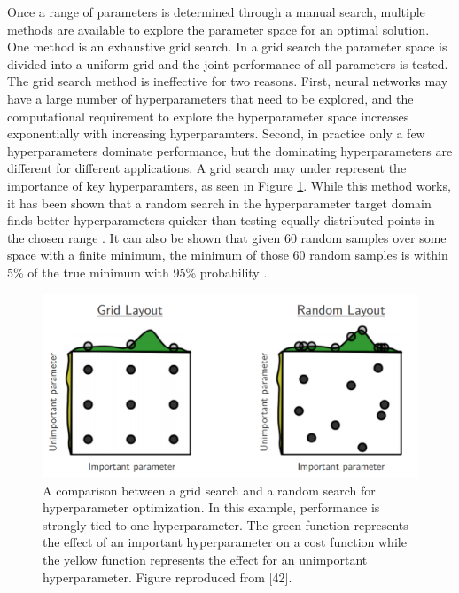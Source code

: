 Once a range of parameters is determined through a manual search, multiple methods are available to explore the parameter space for an optimal solution. One method is an exhaustive grid search. In a grid search the parameter space is divided into a uniform grid and the joint performance of all parameters is tested. The grid search method is ineffective for two reasons. First, neural networks may have a large number of hyperparameters that need to be explored, and the computational requirement to explore the hyperparameter space increases exponentially with increasing hyperparamters. Second, in practice only a few hyperparameters dominate performance, but the dominating hyperparameters are different for different applications. A grid search may under represent the importance of key hyperparamters, as seen in Figure \ref{fig:Bergstra12a_hyperparameter_grid_vs_random}.  While this method works, it has been shown that a random search in the hyperparameter target domain finds better hyperparameters quicker than testing equally distributed points in the chosen range \cite{Bergstra2012}. It can also be shown that given 60 random samples over some space with a finite minimum, the minimum of those 60 random samples is within 5\% of the true minimum with 95\% probability \cite{Zheng2015}.

\begin{figure}[H]
	\centering
	\includegraphics[width=0.99\linewidth]{images/Bergstra12a_hyperparameter_grid_vs_random}
	\caption{A comparison between a grid search and a random search for hyperparameter optimization. In this example, performance is strongly tied to one hyperparameter. The green function represents the effect of an important hyperparameter on a cost function while the yellow function represents the effect for an unimportant hyperparameter. Figure reproduced from [42].}
	\label{fig:Bergstra12a_hyperparameter_grid_vs_random}
\end{figure}


